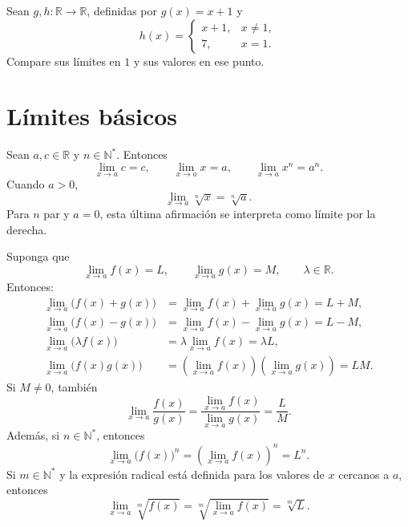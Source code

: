\documentclass[10pt,a5paper]{article}
\newif\ifmostrarSoluciones
\begin{document}
\begin{ejemplo}
Sean $g,h\colon\mathbb{R}\to\mathbb{R}$, definidas por $g(x)=x+1$ y
\[
  h(x)=
  \begin{cases}
    x+1, & x\neq1,\\
    7, & x=1.
  \end{cases}
\]
Compare sus límites en $1$ y sus valores en ese punto.
\end{ejemplo}
\ifmostrarSoluciones
\begin{solucion}
Ambas funciones tienen límite $2$ en $1$, porque coinciden cerca de ese punto cuando $x\neq1$. Sin embargo, $g(1)=2$ y $h(1)=7$.
\end{solucion}
\else\vspace{12mm}\fi

\section*{Límites básicos}

\begin{proposicion}
Sean $a,c\in\mathbb{R}$ y $n\in\mathbb{N}^{*}$. Entonces
\[
\lim_{x\to a}c=c,\qquad
\lim_{x\to a}x=a,\qquad
\lim_{x\to a}x^n=a^n.
\]
Cuando $a>0$,
\[
\lim_{x\to a}\sqrt[n]{x}=\sqrt[n]{a}.
\]
Para $n$ par y $a=0$, esta última afirmación se interpreta como límite por la derecha.
\end{proposicion}

\begin{teorema}
Suponga que
\[
  \displaystyle \lim_{x\to a}f(x)=L,
  \qquad
  \displaystyle \lim_{x\to a}g(x)=M,
  \qquad
  \lambda\in\mathbb{R}.
\]
Entonces:
\begin{align*}
\displaystyle \lim_{x\to a}\bigl(f(x)+g(x)\bigr)
  &=\displaystyle \lim_{x\to a}f(x)
    +\displaystyle \lim_{x\to a}g(x)
    =L+M,\\
\displaystyle \lim_{x\to a}\bigl(f(x)-g(x)\bigr)
  &=\displaystyle \lim_{x\to a}f(x)
    -\displaystyle \lim_{x\to a}g(x)
    =L-M,\\
\displaystyle \lim_{x\to a}\bigl(\lambda f(x)\bigr)
  &=\lambda\displaystyle \lim_{x\to a}f(x)
    =\lambda L,\\
\displaystyle \lim_{x\to a}\bigl(f(x)g(x)\bigr)
  &=\left(\displaystyle \lim_{x\to a}f(x)\right)
    \left(\displaystyle \lim_{x\to a}g(x)\right)
    =LM.
\end{align*}
Si $M\neq0$, también
\[
  \displaystyle \lim_{x\to a}\frac{f(x)}{g(x)}
  =\frac{\displaystyle \lim_{x\to a}f(x)}
         {\displaystyle \lim_{x\to a}g(x)}
  =\frac{L}{M}.
\]
Además, si $n\in\mathbb{N}^{*}$, entonces
\[
  \displaystyle \lim_{x\to a}\bigl(f(x)\bigr)^n
  =\left(\displaystyle \lim_{x\to a}f(x)\right)^n
  =L^n.
\]
Si $m\in\mathbb{N}^{*}$ y la expresión radical está definida para los valores de $x$ cercanos a $a$, entonces
\[
  \displaystyle \lim_{x\to a}\sqrt[m]{f(x)}
  =\sqrt[m]{\displaystyle \lim_{x\to a}f(x)}
  =\sqrt[m]{L}.
\]
\end{teorema}
\end{document}
